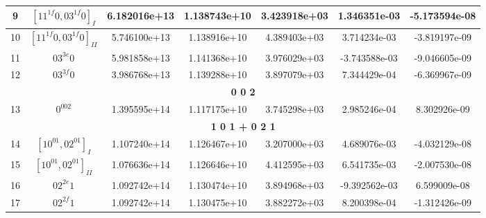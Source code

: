 \begin{table}[h!]
\begin{tabular}{|c|c|c|c|c|c|c|}
9 & $[11^{1f}0, 03^{1f}0]_{I}$ & 6.182016e+13 & 1.138743e+10 & 3.423918e+03 & 1.346351e-03 & -5.173594e-08 \\ \hline
10 & $[11^{1f}0, 03^{1f}0]_{II}$ & 5.746100e+13 & 1.138916e+10 & 4.389403e+03 & 3.714234e-03 & -3.819197e-09 \\ \hline
11 & $03^{3e}0$ & 5.981858e+13 & 1.141368e+10 & 3.976029e+03 & -3.743588e-03 & -9.046605e-09 \\ \hline
12 & $03^{3f}0$ & 3.986768e+13 & 1.139288e+10 & 3.897079e+03 & 7.344429e-04 & -6.369967e-09 \\ \hline
\multicolumn{7}{|c|}{\textbf{0 0 2}} \\ \hline
13 & $0^002$ & 1.395595e+14 & 1.117175e+10 & 3.745298e+03 & 2.985246e-04 & 8.302926e-09 \\ \hline
\multicolumn{7}{|c|}{\textbf{1 0 1 + 0 2 1}} \\ \hline
14 & $[10^01, 02^01]_{I}$ & 1.107240e+14 & 1.126467e+10 & 3.207000e+03 & 4.689076e-03 & -4.032129e-08 \\ \hline
15 & $[10^01, 02^01]_{II}$ & 1.076636e+14 & 1.126646e+10 & 4.412595e+03 & 6.541735e-03 & -2.007530e-08 \\ \hline
16 & $02^{2e}1$ & 1.092742e+14 & 1.130474e+10 & 3.894968e+03 & -9.392562e-03 & 6.599009e-08 \\ \hline
17 & $02^{2f}1$ & 1.092742e+14 & 1.130475e+10 & 3.882272e+03 & 8.200398e-04 & -1.312426e-09 \\ \hline
\end{tabular}
\end{table}


